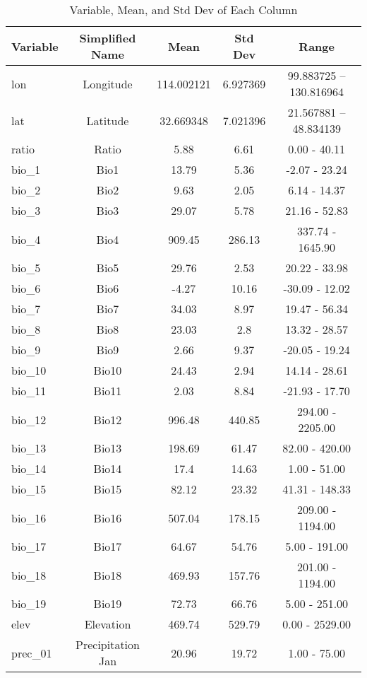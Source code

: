 \begin{table}[H]
	\caption{Variable, Mean, and Std Dev of Each Column}
	\label{tab:range}
	\hspace*{-3.17cm}  %
		\begin{tabular}{lcccc}
			\toprule
			Variable & Simplified Name & Mean & Std Dev & Range \\ \midrule
			lon & Longitude & 114.002121 & 6.927369 & 99.883725 -- 130.816964 \\
			lat & Latitude & 32.669348 & 7.021396 & 21.567881 -- 48.834139 \\
			ratio & Ratio & 5.88 & 6.61 & 0.00 - 40.11 \\
			bio\_1 & Bio1 & 13.79 & 5.36 & -2.07 - 23.24 \\
			bio\_2 & Bio2 & 9.63 & 2.05 & 6.14 - 14.37 \\
			bio\_3 & Bio3 & 29.07 & 5.78 & 21.16 - 52.83 \\
			bio\_4 & Bio4 & 909.45 & 286.13 & 337.74 - 1645.90 \\
			bio\_5 & Bio5 & 29.76 & 2.53 & 20.22 - 33.98 \\
			bio\_6 & Bio6 & -4.27 & 10.16 & -30.09 - 12.02 \\
			bio\_7 & Bio7 & 34.03 & 8.97 & 19.47 - 56.34 \\
			bio\_8 & Bio8 & 23.03 & 2.8 & 13.32 - 28.57 \\
			bio\_9 & Bio9 & 2.66 & 9.37 & -20.05 - 19.24 \\
			bio\_10 & Bio10 & 24.43 & 2.94 & 14.14 - 28.61 \\
			bio\_11 & Bio11 & 2.03 & 8.84 & -21.93 - 17.70 \\
			bio\_12 & Bio12 & 996.48 & 440.85 & 294.00 - 2205.00 \\
			bio\_13 & Bio13 & 198.69 & 61.47 & 82.00 - 420.00 \\
			bio\_14 & Bio14 & 17.4 & 14.63 & 1.00 - 51.00 \\
			bio\_15 & Bio15 & 82.12 & 23.32 & 41.31 - 148.33 \\
			bio\_16 & Bio16 & 507.04 & 178.15 & 209.00 - 1194.00 \\
			bio\_17 & Bio17 & 64.67 & 54.76 & 5.00 - 191.00 \\
			bio\_18 & Bio18 & 469.93 & 157.76 & 201.00 - 1194.00 \\
			bio\_19 & Bio19 & 72.73 & 66.76 & 5.00 - 251.00 \\
			elev & Elevation & 469.74 & 529.79 & 0.00 - 2529.00 \\
			prec\_01 & Precipitation Jan & 20.96 & 19.72 & 1.00 - 75.00 \\

\end{tabular}
\end{table}
